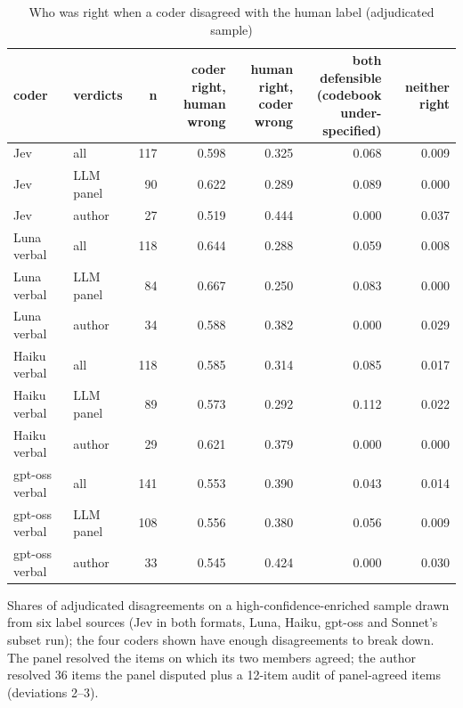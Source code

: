 \begin{table}[t]
\centering
\small
\caption{Who was right when a coder disagreed with the human label (adjudicated sample)}
\label{tab:tab12_adjudication}
\begin{adjustbox}{max width=\linewidth}
\begin{tabular}{llrrrrr}
\toprule
coder & verdicts & n & \makecell[br]{coder right, \\{} human wrong} & \makecell[br]{human right, \\{} coder wrong} & \makecell[br]{both \\{} defensible \\{} (codebook \\{} under-specified)} & neither right \\
\midrule
Jev & all & 117 & 0.598 & 0.325 & 0.068 & 0.009 \\
Jev & LLM panel & 90 & 0.622 & 0.289 & 0.089 & 0.000 \\
Jev & author & 27 & 0.519 & 0.444 & 0.000 & 0.037 \\
Luna verbal & all & 118 & 0.644 & 0.288 & 0.059 & 0.008 \\
Luna verbal & LLM panel & 84 & 0.667 & 0.250 & 0.083 & 0.000 \\
Luna verbal & author & 34 & 0.588 & 0.382 & 0.000 & 0.029 \\
Haiku verbal & all & 118 & 0.585 & 0.314 & 0.085 & 0.017 \\
Haiku verbal & LLM panel & 89 & 0.573 & 0.292 & 0.112 & 0.022 \\
Haiku verbal & author & 29 & 0.621 & 0.379 & 0.000 & 0.000 \\
gpt-oss verbal & all & 141 & 0.553 & 0.390 & 0.043 & 0.014 \\
gpt-oss verbal & LLM panel & 108 & 0.556 & 0.380 & 0.056 & 0.009 \\
gpt-oss verbal & author & 33 & 0.545 & 0.424 & 0.000 & 0.030 \\
\bottomrule
\end{tabular}
\end{adjustbox}
\par\smallskip\footnotesize\raggedright Shares of adjudicated disagreements on a high-confidence-enriched sample drawn from six label sources (Jev in both formats, Luna, Haiku, gpt-oss and Sonnet's subset run); the four coders shown have enough disagreements to break down. The panel resolved the items on which its two members agreed; the author resolved 36 items the panel disputed plus a 12-item audit of panel-agreed items (deviations 2--3).
\end{table}
